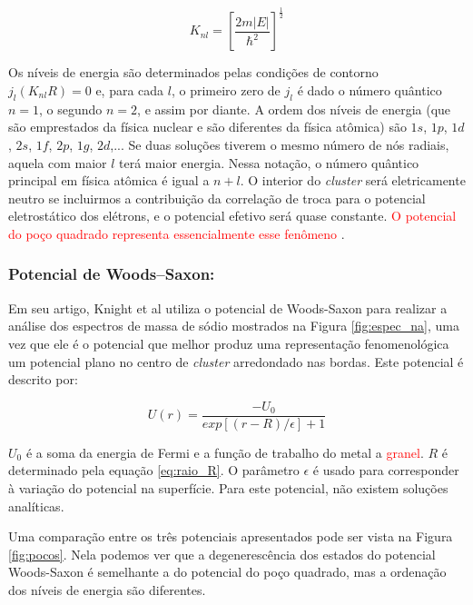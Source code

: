 \begin{equation}
    K_{nl}=\left[\frac{2m|E|}{\hbar^2}\right]^{\frac{1}{2}}
\end{equation}

Os níveis de energia são determinados pelas condições de contorno $j_{l}(K_{nl}R)=0$ e, para cada $l$, o primeiro zero de $j_l$ é dado o número quântico $n = 1$, o segundo $n = 2$, e assim por diante. A ordem dos níveis de energia (que são emprestados da física nuclear e são diferentes da física atômica) são $1s$, $1p$, $1d$, $2s$, $1f$, $2p$, $1g$, $2d$,... Se duas soluções tiverem o mesmo número de nós radiais, aquela com maior $l$ terá maior energia. Nessa notação, o número quântico principal em física atômica é igual a $n + l$. O interior do \textit{cluster} será eletricamente neutro se incluirmos a contribuição da correlação de troca para o potencial eletrostático dos elétrons, e o potencial efetivo será quase constante. \textcolor{red}{O potencial do poço quadrado representa essencialmente esse fenômeno} \cite{livro_cap16_Misra2012527}.


\subsubsection{Potencial de Woods–Saxon:}

Em seu artigo, Knight et al\cite{electronic_Shell_sodium} utiliza o potencial de Woods-Saxon para realizar a análise dos espectros de massa de sódio mostrados na Figura \ref{fig:espec_na}\cite{livro_cap16_Misra2012527}, uma vez que ele é o potencial que melhor produz uma representação fenomenológica um potencial plano no centro de \textit{cluster} arredondado nas bordas. Este potencial é descrito por:

\begin{equation}
    U(r)=\frac{-U_0}{exp[(r-R)/\epsilon]+1}
\end{equation}


$U_0$ é a soma da energia de Fermi e a função de trabalho do metal a \textcolor{red}{granel}. $R$ é determinado pela equação \ref{eq:raio_R}. O parâmetro $\epsilon$ é usado para corresponder à variação do potencial na superfície. Para este potencial, não existem soluções analíticas.


Uma comparação entre os três potenciais apresentados pode ser vista na Figura \ref{fig:pocos}. Nela podemos ver que a degenerescência dos estados do potencial Woods-Saxon é semelhante a do potencial do poço quadrado, mas a ordenação dos níveis de energia são diferentes.

